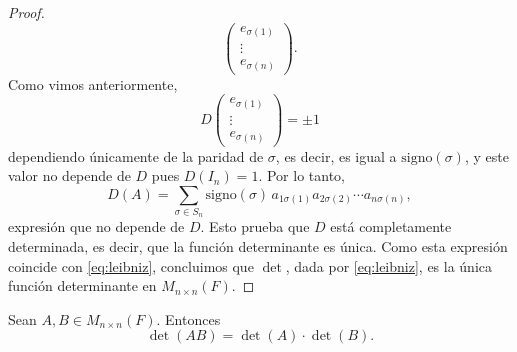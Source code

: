 \documentclass[12pt,a4paper]{book}
\begin{document}
\begin{proof}
\begin{equation*}
            \begin{pmatrix}
                e_{\sigma(1)} \\
                \vdots \\
                e_{\sigma(n)}
            \end{pmatrix}.
        \end{equation*}
        Como vimos anteriormente,
        \begin{equation*}
            D
            \begin{pmatrix}
                e_{\sigma(1)} \\
                \vdots \\
                e_{\sigma(n)}
            \end{pmatrix}
            = \pm 1
        \end{equation*}
        dependiendo únicamente de la paridad de $\sigma$, es decir, es igual a $\text{signo}(\sigma)$, y este valor no depende de $D$ pues $D(I_n) = 1$. Por lo tanto,
        \begin{equation*}
            D(A) = \sum_{\sigma \in S_n} \text{signo}(\sigma) \, a_{1\sigma(1)} a_{2\sigma(2)} \cdots a_{n\sigma(n)},
        \end{equation*}
        expresión que no depende de $D$. Esto prueba que $D$ está completamente determinada, es decir, que la función determinante es única. Como esta expresión coincide con \eqref{eq:leibniz}, concluimos que $\det$, dada por \eqref{eq:leibniz}, es la única función determinante en $M_{n \times n}(F)$.
    \end{proof}

    \begin{proposicion}
        Sean $A, B \in M_{n \times n}(F)$. Entonces
        \begin{equation*}
            \det(AB) = \det(A) \cdot \det(B).
        \end{equation*}
    \end{proposicion}
\end{document}
